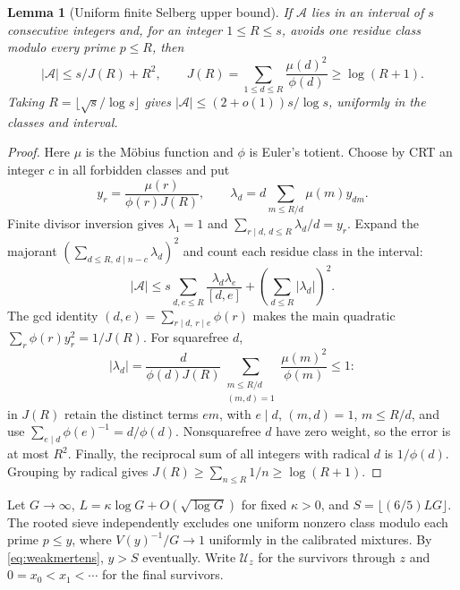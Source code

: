 \documentclass[11pt,a4paper]{article}
\newtheorem{lemma}[theorem]{Lemma}
\begin{document}
\begin{lemma}[Uniform finite Selberg upper bound]\label{lem:selbergcap}
If $\mathcal A$ lies in an interval of $s$ consecutive integers and,
for an integer $1\le R\le s$, avoids one residue class modulo every
prime $p\le R$, then
\[
 |\mathcal A|\le s/J(R)+R^2,\qquad
 J(R)=\sum_{1\le d\le R}\frac{\mu(d)^2}{\phi(d)}
                              \ge\log(R+1).
\]
Taking $R=\lfloor\sqrt{s}/\log s\rfloor$ gives
$|\mathcal A|\le(2+o(1))s/\log s$, uniformly in the classes and interval.
\end{lemma}
\begin{proof}
Here $\mu$ is the M\"obius function and $\phi$ is Euler's totient.
Choose by CRT an integer $c$ in all forbidden classes and put
\[
 y_r=\frac{\mu(r)}{\phi(r)J(R)},\qquad
 \lambda_d=d\sum_{m\le R/d}\mu(m)y_{dm}.
\]
Finite divisor inversion gives $\lambda_1=1$ and
$\sum_{r\mid d,\,d\le R}\lambda_d/d=y_r$.
Expand the majorant $(\sum_{d\le R,\,d\mid n-c}\lambda_d)^2$ and
count each residue class in the interval:
\[
 |\mathcal A|\le s\sum_{d,e\le R}
       \frac{\lambda_d\lambda_e}{[d,e]}
                       +\left(\sum_{d\le R}|\lambda_d|\right)^2.
\]
The gcd identity $(d,e)=\sum_{r\mid d,\,r\mid e}\phi(r)$ makes the
main quadratic $\sum_r\phi(r)y_r^2=1/J(R)$. For squarefree $d$,
\[
 |\lambda_d|=\frac{d}{\phi(d)J(R)}
       \sum_{\substack{m\le R/d\\(m,d)=1}}\frac{\mu(m)^2}{\phi(m)}
       \le1:
\]
in $J(R)$ retain the distinct terms $em$, with $e\mid d$,
$(m,d)=1$, $m\le R/d$, and use
$\sum_{e\mid d}\phi(e)^{-1}=d/\phi(d)$.
Nonsquarefree $d$ have zero weight, so the error is at most $R^2$.
Finally, the reciprocal sum of all integers with radical $d$ is
$1/\phi(d)$. Grouping by radical gives
$J(R)\ge\sum_{n\le R}1/n\ge\log(R+1)$.
\end{proof}

Let $G\to\infty$, $L=\kappa\log G+O(\sqrt{\log G})$ for fixed
$\kappa>0$, and $S=\lfloor(6/5)LG\rfloor$. The rooted sieve independently
excludes one uniform nonzero class modulo each prime $p\le y$, where
$V(y)^{-1}/G\to1$ uniformly in the calibrated mixtures. By
\eqref{eq:weakmertens}, $y>S$ eventually. Write $\mathcal U_z$ for
the survivors through $z$ and $0=x_0<x_1<\cdots$ for the final survivors.
\end{document}
